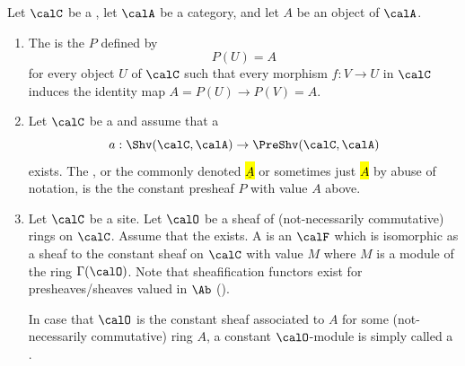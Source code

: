 
\begin{definition} \label{definition:constant_sheaf_on_a_site_with_sheafification}
    Let $\calC$ be a , let $\calA$ be a category, and let $A$ be an object of $\calA$. %
    
    \begin{enumerate}
        \item The  is the  $P$ defined by
        \[
        P(U) = A
        \]
        for every object $U$ of $\calC$ such that every morphism $f: V \to U$ in $\calC$ induces the identity map $A = P(U)\to P(V) = A$. 

        \item Let $\calC$ be a  and assume that a  
        $$a: \Shv(\calC, \calA) \to \PreShv(\calC, \calA)$$
        exists.
        The , or the  commonly denoted \hl{$\underline{A}$} or sometimes just \hl{$A$} by abuse of notation, is the  the constant presheaf $P$ with value $A$ above.

        \item Let $\calC$ be a site. Let $\calO$ be a sheaf of (not-necessarily commutative) rings on $\calC$. Assume that the  exists. A  is an  $\calF$ which is isomorphic as a sheaf to the constant sheaf on $\calC$ with value $M$ where $M$ is a module of the ring $\Gamma(\calO)$. Note that sheafification functors exist for presheaves/sheaves valued in $\Ab$ ().

        In case that $\calO$ is the constant sheaf associated to $A$ for some (not-necessarily commutative) ring $A$, a constant $\calO$-module is simply called a .
    \end{enumerate}
\end{definition}
